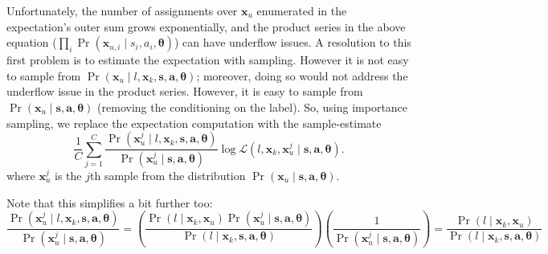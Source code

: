 Unfortunately, 
the number of assignments over $\bm{x}_u$ enumerated in the
expectation's outer sum grows exponentially, and the product series in
the above equation ($\prod_i \Pr(\bm{x}_{u,i} \mid s_i,
a_i, \bm{\theta})$) can have underflow issues.  A resolution to this
first problem is to estimate the expectation with sampling.  However
it is not easy to sample from $\Pr(\bm{x}_u \mid l, \bm{x}_k, \bm{s}, 
\bm{a}, \bm{\theta})$; moreover, doing so would not address the
underflow issue in the product series. However, it is easy to sample
from $\Pr(\bm{x}_u \mid \bm{s}, \bm{a}, \bm{\theta})$ (removing the
conditioning on the label). 
%
%
So, using importance sampling, we replace the expectation computation
with the sample-estimate
\begin{equation}
\frac{1}{C} \sum_{j=1}^C \frac{\Pr(\bm{x}_u^j \mid l, \bm{x}_k, \bm{s}, \bm{a}, \bm{\theta})}{\Pr(\bm{x}_u^j \mid \bm{s}, \bm{a}, \bm{\theta})} \log\mathcal{L}(l, \bm{x}_k, \bm{x}_u^j \mid \bm{s}, \bm{a}, \bm{\theta}).
\end{equation}
where $\bm{x}_u^j$ is the $j$th sample from the distribution $\Pr(\bm{x}_u \mid \bm{s}, \bm{a}, \bm{\theta})$.

Note that this simplifies a bit further too:
\begin{equation*}
\frac{\Pr(\bm{x}_u^j \mid l, \bm{x}_k, \bm{s}, \bm{a}, \bm{\theta})}{\Pr(\bm{x}_u^j \mid \bm{s}, \bm{a}, \bm{\theta})} 
= \left( \frac{\Pr(l \mid \bm{x}_k, \bm{x}_u) \Pr(\bm{x}_u^j \mid \bm{s}, \bm{a}, \bm{\theta}) }{\Pr(l \mid \bm{x}_k, \bm{s}, \bm{a}, \bm{\theta})} \right) \left( \frac{1}{\Pr(\bm{x}_u^j \mid \bm{s}, \bm{a}, \bm{\theta})} \right)
= \frac{\Pr(l \mid \bm{x}_k, \bm{x}_u)}{\Pr(l \mid \bm{x}_k, \bm{s}, \bm{a}, \bm{\theta})}
\end{equation*}


